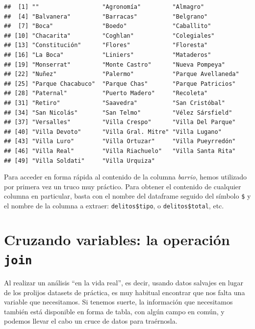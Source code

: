 \documentclass[
]{book}
\begin{document}
\begin{verbatim}
##  [1] ""                  "Agronomía"         "Almagro"          
##  [4] "Balvanera"         "Barracas"          "Belgrano"         
##  [7] "Boca"              "Boedo"             "Caballito"        
## [10] "Chacarita"         "Coghlan"           "Colegiales"       
## [13] "Constitución"      "Flores"            "Floresta"         
## [16] "La Boca"           "Liniers"           "Mataderos"        
## [19] "Monserrat"         "Monte Castro"      "Nueva Pompeya"    
## [22] "Nuñez"             "Palermo"           "Parque Avellaneda"
## [25] "Parque Chacabuco"  "Parque Chas"       "Parque Patricios" 
## [28] "Paternal"          "Puerto Madero"     "Recoleta"         
## [31] "Retiro"            "Saavedra"          "San Cristóbal"    
## [34] "San Nicolás"       "San Telmo"         "Vélez Sársfield"  
## [37] "Versalles"         "Villa Crespo"      "Villa Del Parque" 
## [40] "Villa Devoto"      "Villa Gral. Mitre" "Villa Lugano"     
## [43] "Villa Luro"        "Villa Ortuzar"     "Villa Pueyrredón" 
## [46] "Villa Real"        "Villa Riachuelo"   "Villa Santa Rita" 
## [49] "Villa Soldati"     "Villa Urquiza"
\end{verbatim}

Para acceder en forma rápida al contenido de la columna \emph{barrio}, hemos utilizado por primera vez un truco muy práctico. Para obtener el contenido de cualquier columna en particular, basta con el nombre del dataframe seguido del símbolo \texttt{\$} y el nombre de la columna a extraer: \texttt{delitos\$tipo}, o \texttt{delitos\$total}, etc.

\hypertarget{cruzando-variables-la-operaciuxf3n-join}{%
\section{\texorpdfstring{Cruzando variables: la operación \texttt{join}}{Cruzando variables: la operación join}}\label{cruzando-variables-la-operaciuxf3n-join}}

Al realizar un análisis ``en la vida real'', es decir, usando datos salvajes en lugar de los prolijos datasets de práctica, es muy habitual encontrar que nos falta una variable que necesitamos. Si tenemos suerte, la información que necesitamos también está disponible en forma de tabla, con algún campo en común, y podemos llevar el cabo un cruce de datos para traérnosla.
\end{document}
